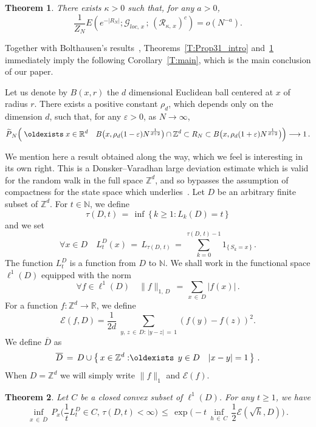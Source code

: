 \documentclass[10pt]{amsart}
\newtheorem{theo}{Theorem}[section]
\theoremstyle{definition}\newtheorem{defi}[theo]{Definition}\newtheorem{rema}[theo]{Remark}\newtheorem{exam}[theo]{Example}\newtheorem{exem}[theo]{Example}\newtheorem{nota}[theo]{Notation}
\newcommand*\bD{\overline{D}}
\newcommand*\Z {{\mathbb Z}}
\newcommand*\Zd {{\mathbb Z^d}}
\newcommand*\Rd {{\mathbb R^d}}
\newcommand*\R{\mathbb{R}}
\newcommand*\N {{\mathbb N}}
\newcommand*\E {{E}}
\newcommand*\wP{\smash{\widetilde P}}
\newcommand{\cE}{\mathcal{E}}
\newcommand{\cG}{\mathcal{G}}
\newcommand{\cR}{\mathcal{R}}
\renewcommand{\N}{\mathbb{N}}
\renewcommand*{\exists}{\mathrel{\oldexists}}
\let\oldforall\forall
\renewcommand*{\forall}{\mathrel{\oldforall}}
\begin{document}
\begin{theo}\label{T:filledball_intro}
There exists $\kappa>0$ such that, for any $a>0$,
\[
\frac1{Z_N}\E\left(e^{ - |R_N|} ; \cG_{loc,\,x}\,;\,(\cR_{\kappa,\,x})^c\right) = o(N^{-a}).
\]
\end{theo}


Together with Bolthausen's results~\cite[see p.~877, immediately below Conjecture~1.3]{BO}, Theorems~\ref{T:Prop31_intro} and~\ref{T:filledball_intro} immediately imply the following Corollary~\ref{T:main}, which is the main conclusion of our paper.

\begin{coro}\label{T:main}
Let us denote by $B(x,r)$ the $d$ dimensional Euclidean ball centered at $x$ of radius $r$. There exists a positive constant $\rho_d$, which depends only on the dimension $d$, such that, for any $\varepsilon>0$, as $N \to \infty$,
\[
\wP_N\Big(\exists x\in\Rd\quad B\big(x,\rho_d(1-\varepsilon)N^{\frac{1}{d+2}}\big)
\cap\Zd
\subset R_N
\subset
B\big(x,\rho_d(1+\varepsilon)N^{\frac{1}{d+2}}\big)\Big)\longrightarrow 1\,.
\]
\end{coro}


We mention here a result obtained along the way, which we feel is interesting in its own right. This is a Donsker--Varadhan large deviation estimate which is valid for the random walk in the full space $\mathbb{Z}^d$, and so bypasses the assumption of compactness for the state space which underlies~\cite{DV1}. Let $D$ be an arbitrary finite subset of $\Zd$. For $t\in \N$, we define
\[
\tau(D,t)\,=\,\inf\,\big\{\,k\geq 1:L_k(D)=t\,\big\}\,
\]
and we set
\[
\forall x\in D\quad
L_t^D(x)\,=\,L_{\tau(D,\,t)}\,=\,\sum_{k=0}^{\tau(D,\,t)-1}1_{\{\,S_k=x\,\}}\,.
\]
The function $L_t^D$ is a function from $D$ to $\N$. We shall work in the functional space $\ell^1(D)$ equipped with the norm
\[
\forall f\in\ell^1(D)\quad
\|f\|_{1,\,D}\,=\,\sum_{x\,\in\,D}|f(x)|\,.
\]
For a function $f: \Z^d \to \R$, we define
\begin{equation}\label{defE}
\cE(f,D) = \frac1{2d}\;\sum_{y,\,z\,\in\,D:\,| y -z|\,=\,1} (f(y) - f(z))^2.
\end{equation}
We define $\bD$ as
\[
\bD\,=\,D\cup\left\{\,x\in\Zd:\exists\, y\in D\quad |x-y|=1\,\right\}\,.
\]
When $D = \Z^d$ we will simply write $\|f\|_1$ and $\cE(f)$.
\begin{theo}\label{GD}
Let $C$ be a closed convex subset of $\ell^1(D)$. For any $t\geq 1$, we have
\[
\inf_{x\,\in\,\bD}\,P_x\bigg(\frac{1}{t}L_t^D\in C,\,
\tau(D,t)<\infty\bigg)\,\leq\,
\exp\bigg(-t\,\inf_{h\,\in\,C}\,\frac{1}{2}\cE(\sqrt{h},D)
\bigg)
\,.
\]
\end{theo}
\end{document}
